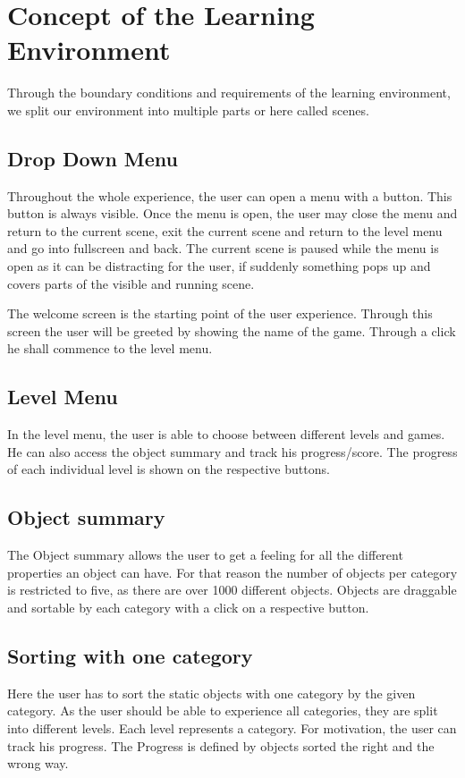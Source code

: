 \section{Concept of the Learning Environment}
Through the boundary conditions and requirements of the learning environment,
we split our environment into multiple parts or here called scenes.

\subsection{Drop Down Menu}
Throughout the whole experience, the user can open a menu with a button.
This button is always visible.
Once the menu is open, the user may close the menu and return to the current scene,
exit the current scene and return to the level menu and go into fullscreen and back.
The current scene is paused while the menu is open as it can be distracting for the user,
if suddenly something pops up and covers parts of the visible and running scene.

The welcome screen is the starting point of the user experience.
Through this screen the user will be greeted by showing the name of the game.
Through a click he shall commence to the level menu.

\subsection{Level Menu}
In the level menu, the user is able to choose between different levels and games.
He can also access the object summary and track his progress/score.
The progress of each individual level is shown on the respective buttons.

\subsection{Object summary}
The Object summary allows the user to get a feeling for all the different properties an object can have.
For that reason the number of objects per category is restricted to five, as there are over 1000 different objects.
Objects are draggable and sortable by each category with a click on a respective button.

\subsection{Sorting with one category}
Here the user has to sort the static objects with one category by the given category.
As the user should be able to experience all categories, they are split into different levels.
Each level represents a category.
For motivation, the user can track his progress.
The Progress is defined by objects sorted the right and the wrong way.

